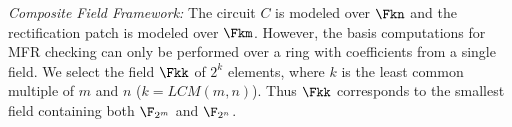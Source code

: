 

{\it Composite Field Framework:} The circuit $C$ is modeled over
$\Fkn$ and the rectification patch is modeled over $\Fkm$. However, the \Grobner basis 
computations for MFR checking can only be performed over a ring with
coefficients from a single field. We select the field $\Fkk$
of $2^k$ elements, where $k$ is the least common multiple of $m$ and
$n$ ($k=LCM(m,n)$). Thus $\Fkk$ corresponds to the smallest field
containing both $\F_{2^m}$ and $\F_{2^n}$.


